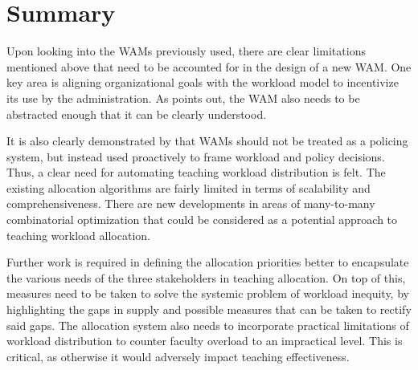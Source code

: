 \section{Summary}

Upon looking into the WAMs previously used, there are clear limitations mentioned above that need to be accounted for in the design of a new WAM. One key area is aligning organizational goals with the workload model to incentivize its use by the administration. As \cite{vardi2009impacts} points out, the WAM also needs to be abstracted enough that it can be clearly understood.

It is also clearly demonstrated by \cite{kenny2014effectiveness} that WAMs should not be treated as a policing system, but instead used proactively to frame workload and policy decisions. Thus, a clear need for automating teaching workload distribution is felt. The existing allocation algorithms are fairly limited in terms of scalability and comprehensiveness. There are new developments in areas of many-to-many combinatorial optimization that could be considered as a potential approach to teaching workload allocation.

Further work is required in defining the allocation priorities better to encapsulate the various needs of the three stakeholders in teaching allocation. On top of this, measures need to be taken to solve the systemic problem of workload inequity, by highlighting the gaps in supply and possible measures that can be taken to rectify said gaps. The allocation system also needs to incorporate practical limitations of workload distribution to counter faculty overload to an impractical level. This is critical, as otherwise it would adversely impact teaching effectiveness.
